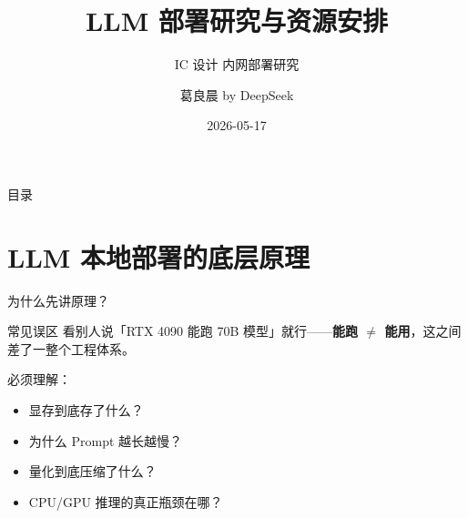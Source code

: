 \documentclass[UTF8,11pt,aspectratio=169]{beamer}
\title[LLM 部署研究]{LLM 部署研究与资源安排}
\subtitle{IC 设计 内网部署研究}
\author{葛良晨 by DeepSeek }
\date{2026-05-17}
\institute{数字IC}
\begin{document}
\begin{frame}
  \titlepage
\end{frame}

\begin{frame}{目录}
  \tableofcontents[hideallsubsections]
\end{frame}

\section{LLM 本地部署的底层原理}

\begin{frame}{为什么先讲原理？}
  \begin{alertblock}{常见误区}
    看别人说「RTX 4090 能跑 70B 模型」就行------\textbf{能跑 $\neq$ 能用}，这之间差了一整个工程体系。
  \end{alertblock}

  \vspace{0.5em}
  必须理解：
  \begin{itemize}
    \item 显存到底存了什么？
    \item 为什么 Prompt 越长越慢？
    \item 量化到底压缩了什么？
    \item CPU/GPU 推理的真正瓶颈在哪？
  \end{itemize}
\end{frame}
\end{document}
